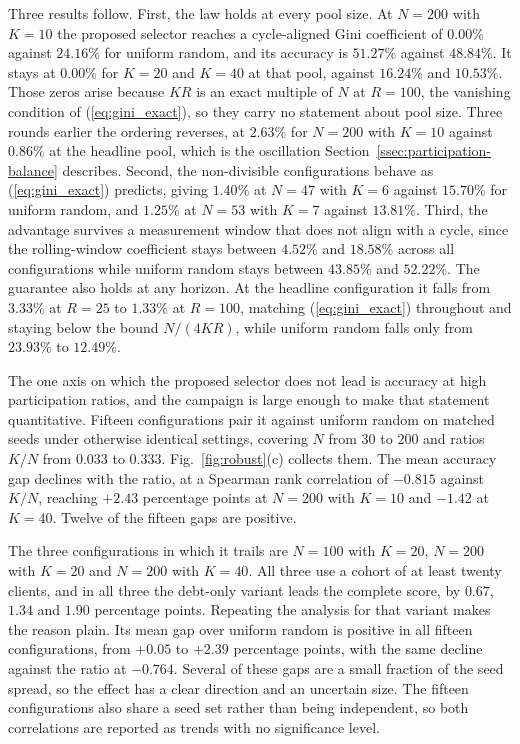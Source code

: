 \documentclass[journal]{IEEEtran}
\newcommand{\rev}[1]{#1}
\begin{document}
\rev{Three results follow. First, the law holds at every pool size. At $N = 200$ with $K = 10$ the proposed selector reaches a cycle-aligned Gini coefficient of $0.00\%$ against $24.16\%$ for uniform random, and its accuracy is $51.27\%$ against $48.84\%$. It stays at $0.00\%$ for $K = 20$ and $K = 40$ at that pool, against $16.24\%$ and $10.53\%$. Those zeros arise because $KR$ is an exact multiple of $N$ at $R = 100$, the vanishing condition of (\ref{eq:gini_exact}), so they carry no statement about pool size. Three rounds earlier the ordering reverses, at $2.63\%$ for $N=200$ with $K=10$ against $0.86\%$ at the headline pool, which is the oscillation Section~\ref{ssec:participation-balance} describes. Second, the non-divisible configurations behave as (\ref{eq:gini_exact}) predicts, giving $1.40\%$ at $N = 47$ with $K = 6$ against $15.70\%$ for uniform random, and $1.25\%$ at $N = 53$ with $K = 7$ against $13.81\%$. Third, the advantage survives a measurement window that does not align with a cycle, since the rolling-window coefficient stays between $4.52\%$ and $18.58\%$ across all configurations while uniform random stays between $43.85\%$ and $52.22\%$. The guarantee also holds at any horizon. At the headline configuration it falls from $3.33\%$ at $R = 25$ to $1.33\%$ at $R = 100$, matching (\ref{eq:gini_exact}) throughout and staying below the bound $N/(4KR)$, while uniform random falls only from $23.93\%$ to $12.49\%$.}

\rev{The one axis on which the proposed selector does not lead is accuracy at high participation ratios, and the campaign is large enough to make that statement quantitative. Fifteen configurations pair it against uniform random on matched seeds under otherwise identical settings, covering $N$ from $30$ to $200$ and ratios $K/N$ from $0.033$ to $0.333$. Fig.~\ref{fig:robust}(c) collects them. The mean accuracy gap declines with the ratio, at a Spearman rank correlation of $-0.815$ against $K/N$, reaching $+2.43$ percentage points at $N=200$ with $K=10$ and $-1.42$ at $K=40$. Twelve of the fifteen gaps are positive.}


\rev{The three configurations in which it trails are $N = 100$ with $K = 20$, $N = 200$ with $K = 20$ and $N = 200$ with $K = 40$. All three use a cohort of at least twenty clients, and in all three the debt-only variant leads the complete score, by $0.67$, $1.34$ and $1.90$ percentage points. Repeating the analysis for that variant makes the reason plain. Its mean gap over uniform random is positive in all fifteen configurations, from $+0.05$ to $+2.39$ percentage points, with the same decline against the ratio at $-0.764$. Several of these gaps are a small fraction of the seed spread, so the effect has a clear direction and an uncertain size. The fifteen configurations also share a seed set rather than being independent, so both correlations are reported as trends with no significance level.}
\end{document}
